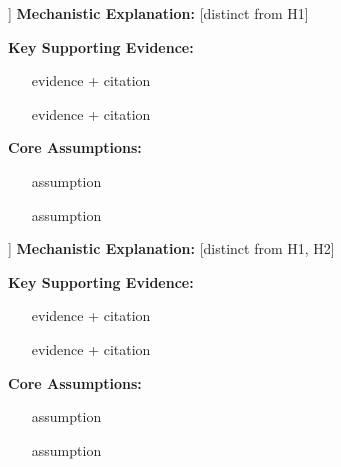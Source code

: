 \documentclass[11pt,letterpaper]{article}
\begin{document}
\newpage
\begin{hypothesisbox2}[Hypothesis 2: [Title]]
\textbf{Mechanistic Explanation:} [distinct from H1]\par\vspace{0.2cm}
\textbf{Key Supporting Evidence:}
\begin{itemize}\item [evidence + citation]\item [evidence + citation]\end{itemize}\vspace{0.2cm}
\textbf{Core Assumptions:}
\begin{enumerate}\item [assumption]\item [assumption]\end{enumerate}
\end{hypothesisbox2}

\newpage
\begin{hypothesisbox3}[Hypothesis 3: [Title]]
\textbf{Mechanistic Explanation:} [distinct from H1, H2]\par\vspace{0.2cm}
\textbf{Key Supporting Evidence:}
\begin{itemize}\item [evidence + citation]\item [evidence + citation]\end{itemize}\vspace{0.2cm}
\textbf{Core Assumptions:}
\begin{enumerate}\item [assumption]\item [assumption]\end{enumerate}
\end{hypothesisbox3}


\end{document}
